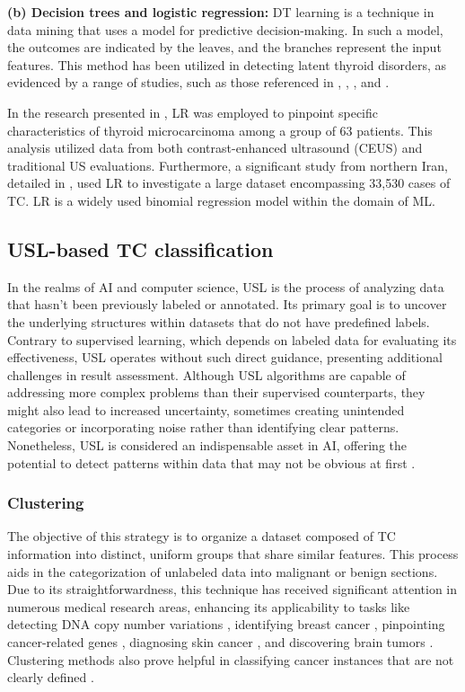 \documentclass[a4paper,fleqn]{cas-sc}
\begin{document}
\vskip2mm

\noindent \textbf{(b) Decision trees and logistic regression:} \ac{DT} learning is a technique in data mining that uses a model for predictive decision-making. In such a model, the outcomes are indicated by the leaves, and the branches represent the input features. This method has been utilized in detecting latent thyroid disorders, as evidenced by a range of studies, such as those referenced in \cite{yadav2020prediction}, \cite{hao2018prognosis}, \cite{dharmarajan2020thyroid}, and \cite{yadav2019decision}.

In the research presented in \cite{zhao2015logistic}, \ac{LR} was employed to pinpoint specific characteristics of thyroid microcarcinoma among a group of 63 patients. This analysis utilized data from both contrast-enhanced ultrasound (CEUS) and traditional \ac{US} evaluations. Furthermore, a significant study from northern Iran, detailed in \cite{yazdani2018factors}, used \ac{LR} to investigate a large dataset encompassing 33,530 cases of TC. \ac{LR} is a widely used binomial regression model within the domain of \ac{ML}.

\subsection{USL-based TC classification}
In the realms of \ac{AI} and computer science, \ac{USL} is the process of analyzing data that hasn't been previously labeled or annotated. Its primary goal is to uncover the underlying structures within datasets that do not have predefined labels. Contrary to supervised learning, which depends on labeled data for evaluating its effectiveness, \ac{USL} operates without such direct guidance, presenting additional challenges in result assessment. Although \ac{USL} algorithms are capable of addressing more complex problems than their supervised counterparts, they might also lead to increased uncertainty, sometimes creating unintended categories or incorporating noise rather than identifying clear patterns. Nonetheless, \ac{USL} is considered an indispensable asset in \ac{AI}, offering the potential to detect patterns  within data that may not be obvious at first \cite{kate2023check, nobile2023unsupervised}.

\subsubsection{Clustering}
The objective of this strategy is to organize a dataset composed of TC information into distinct, uniform groups that share similar features. This process aids in the categorization of unlabeled data into malignant or benign sections. Due to its straightforwardness, this technique has received significant attention in numerous medical research areas, enhancing its applicability to tasks like detecting DNA copy number variations \cite{manogaran2018machine}, identifying breast cancer \cite{agrawal2019combining}, pinpointing cancer-related genes \cite{de2008clustering}, diagnosing skin cancer \cite{anas2017skin}, and discovering brain tumors \cite{khan2021brain}. Clustering methods also prove helpful in classifying cancer instances that are not clearly defined \cite{yu2017clustering}.
\end{document}
